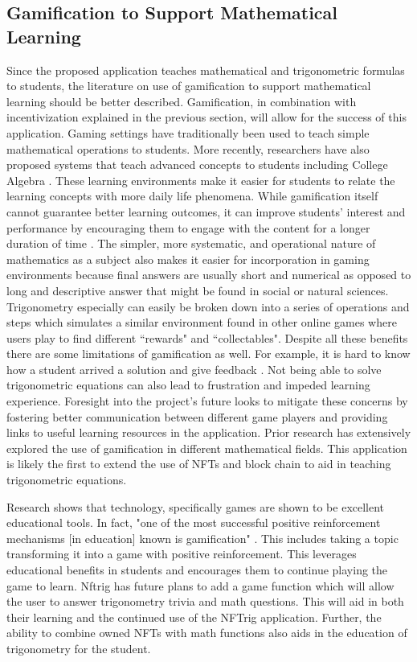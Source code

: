 \documentclass[acmsmall,nonacm]{acmart}
\begin{document}
\subsection{Gamification to Support Mathematical Learning}
Since the proposed application teaches mathematical and trigonometric formulas to students, the literature on use of gamification to support mathematical learning should be better described. Gamification, in combination with incentivization explained in the previous section, will allow for the success of this application. Gaming settings have traditionally been used to teach simple mathematical operations to students. More recently, researchers have also proposed systems that teach  advanced concepts to students including College Algebra \cite{FAGHIHI2014182}. These learning environments make it easier for students to relate the learning concepts with more daily life phenomena. While gamification itself cannot guarantee better learning outcomes, it can improve students' interest and performance by encouraging them to engage with the content for a longer duration of time \cite{JAGUST2018444}. The simpler, more systematic, and operational nature of mathematics as a subject also makes it easier for incorporation in gaming environments because final answers are usually short and numerical as opposed to long and descriptive answer that might be found in social or natural sciences. Trigonometry especially can easily be broken down into a series of operations and steps which simulates a similar environment found in other online games where users play to find different ``rewards" and ``collectables". Despite all these benefits there are some limitations of gamification as well. For example, it is hard to know how a student arrived a solution and give feedback \cite{8363455}. Not being able to solve trigonometric equations can also lead to frustration and impeded learning experience. Foresight into the project's future looks to mitigate these concerns by fostering better communication between different game players and providing links to useful learning resources in the application. Prior research has extensively explored the use of gamification in different mathematical fields. This application is likely the first to extend the use of NFTs and block chain to aid in teaching trigonometric equations.

Research shows that technology, specifically games are shown to be excellent educational tools. In fact, "one of the most successful
positive reinforcement mechanisms [in education] known is gamification" \cite{elmessiry2021nft}. This includes taking a topic transforming it into a game with positive reinforcement. This leverages educational benefits in students and encourages them to continue playing the game to learn. Nftrig has future plans to add a game function which will allow the user to answer trigonometry trivia and math questions. This will aid in both their learning and the continued use of the NFTrig application. Further, the ability to combine owned NFTs with math functions also aids in the education of trigonometry for the student.
\end{document}
